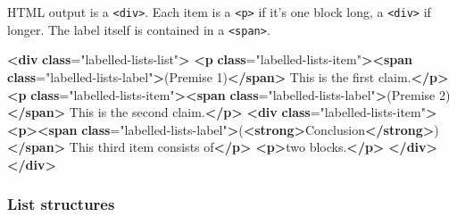 \documentclass[
]{article}
\newenvironment{Shaded}{}{}
\newcommand{\ErrorTok}[1]{\textcolor[rgb]{1.00,0.00,0.00}{\textbf{#1}}}
\newcommand{\KeywordTok}[1]{\textcolor[rgb]{0.00,0.44,0.13}{\textbf{#1}}}
\newcommand{\NormalTok}[1]{#1}
\newcommand{\OtherTok}[1]{\textcolor[rgb]{0.00,0.44,0.13}{#1}}
\newcommand{\StringTok}[1]{\textcolor[rgb]{0.25,0.44,0.63}{#1}}
\begin{document}
HTML output is a \texttt{\textless{}div\textgreater{}}. Each item is a
\texttt{\textless{}p\textgreater{}} if it's one block long, a
\texttt{\textless{}div\textgreater{}} if longer. The label itself is
contained in a \texttt{\textless{}span\textgreater{}}.

\begin{Shaded}
\begin{Highlighting}[]
\KeywordTok{\textless{}div} \ErrorTok{class}\OtherTok{=}\StringTok{"labelled{-}lists{-}list"}\KeywordTok{\textgreater{}}
  \KeywordTok{\textless{}p} \ErrorTok{class}\OtherTok{=}\StringTok{"labelled{-}lists{-}item"}\KeywordTok{\textgreater{}\textless{}span} \ErrorTok{class}\OtherTok{=}\StringTok{"labelled{-}lists{-}label"}\KeywordTok{\textgreater{}}\NormalTok{(Premise 1)}\KeywordTok{\textless{}/span\textgreater{}}\NormalTok{ This is the first claim.}\KeywordTok{\textless{}/p\textgreater{}}
  \KeywordTok{\textless{}p} \ErrorTok{class}\OtherTok{=}\StringTok{"labelled{-}lists{-}item"}\KeywordTok{\textgreater{}\textless{}span} \ErrorTok{class}\OtherTok{=}\StringTok{"labelled{-}lists{-}label"}\KeywordTok{\textgreater{}}\NormalTok{(Premise 2)}\KeywordTok{\textless{}/span\textgreater{}}\NormalTok{ This is the second claim.}\KeywordTok{\textless{}/p\textgreater{}}
  \KeywordTok{\textless{}div} \ErrorTok{class}\OtherTok{=}\StringTok{"labelled{-}lists{-}item"}\KeywordTok{\textgreater{}}
    \KeywordTok{\textless{}p\textgreater{}\textless{}span} \ErrorTok{class}\OtherTok{=}\StringTok{"labelled{-}lists{-}label"}\KeywordTok{\textgreater{}}\NormalTok{(}\KeywordTok{\textless{}strong\textgreater{}}\NormalTok{Conclusion}\KeywordTok{\textless{}/strong\textgreater{}}\NormalTok{)}\KeywordTok{\textless{}/span\textgreater{}}\NormalTok{ This third item consists of}\KeywordTok{\textless{}/p\textgreater{}}
    \KeywordTok{\textless{}p\textgreater{}}\NormalTok{two blocks.}\KeywordTok{\textless{}/p\textgreater{}}
  \KeywordTok{\textless{}/div\textgreater{}}
\KeywordTok{\textless{}/div\textgreater{}}
\end{Highlighting}
\end{Shaded}

\hypertarget{list-structures}{%
\subsubsection{List structures}\label{list-structures}}
\end{document}
